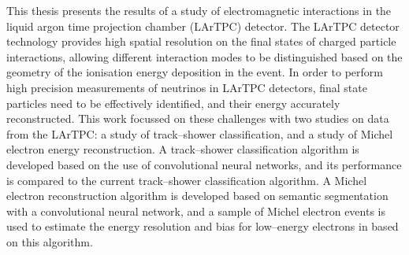 This thesis presents the results of a study of electromagnetic interactions in 
the \protodune{} liquid argon time projection chamber (LArTPC) detector. The 
LArTPC detector technology provides high spatial resolution on the final states 
of charged particle interactions, allowing different interaction modes to be 
distinguished based on the geometry of the ionisation energy deposition in the 
event. In order to perform high precision measurements of neutrinos in LArTPC 
detectors, final state particles need to be effectively identified, and their 
energy accurately reconstructed. This work focussed on these challenges with 
two studies on data from the \protodune{} LArTPC: a study of track--shower 
classification, and a study of Michel electron energy reconstruction. A 
track--shower classification algorithm is developed based on the use of 
convolutional neural networks, and its performance is compared to the current 
track--shower classification algorithm. A Michel electron reconstruction
algorithm is developed based on semantic segmentation with a convolutional
neural network, and a sample of Michel electron events is used to estimate the
energy resolution and bias for low--energy electrons in \protodune{} based on
this algorithm.
